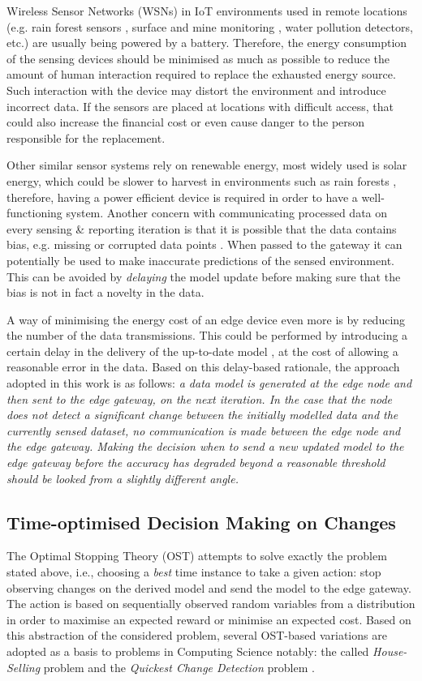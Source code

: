 \documentclass{mpaper}
\begin{document}
Wireless Sensor Networks (WSNs) in IoT environments used in remote locations (e.g. rain forest sensors  \cite{rainforests2009}, surface and mine monitoring \cite{Akkas2018}, water pollution detectors\cite{waterwsn2017}, etc.) are usually being powered by a battery. 
Therefore, the energy consumption of the sensing devices should be minimised as much as possible to reduce the amount of human interaction required to replace the exhausted energy source. 
Such interaction with the device may distort the environment and introduce incorrect data. 
If the sensors are placed at locations with difficult access, that could also increase the financial cost or even cause danger to the person responsible for the replacement.

Other similar sensor systems rely on renewable energy, most widely used is solar energy, which could be slower to harvest in environments such as rain forests \cite{rainforests2009}, 
therefore, having a power efficient device is required in order to have a well-functioning system. Another concern with communicating processed data on every sensing \& reporting iteration is that it is possible that the data contains bias, e.g. missing or corrupted data points \cite{anagnostop2016}. When passed to the gateway it can potentially be used to make inaccurate predictions of the sensed environment. This can be avoided by \textit{delaying} the model update before making sure that the bias is not in fact a novelty in the data.

A way of minimising the energy cost of an edge device even more is by reducing the number of the data transmissions. This could be performed by introducing a certain delay in the delivery of the up-to-date model \citep{anagnostop2014, anagnostop2016, anagnostopkolomvatos2016}, at the cost of allowing a reasonable error in the data. Based on this delay-based rationale, the approach adopted in this work is as follows: \textit{a data model is generated at the edge node and then sent to the edge gateway, on the next iteration. In the case that the node does not detect a significant change between the initially modelled data and the currently sensed dataset, 
no communication is made between the edge node and the edge gateway. 
Making the decision when to send a new updated model to the edge gateway before the accuracy has degraded beyond a reasonable threshold should be looked from a slightly different angle.} 

\subsection{Time-optimised Decision Making on Changes}
The Optimal Stopping Theory (OST) attempts to solve exactly the problem stated above, i.e., choosing a \textit{best} time instance to take a given action: 
stop observing changes on the derived model and send the model to the edge gateway. 
The action is based on sequentially observed random variables from a distribution in order to maximise an expected reward or minimise an expected cost. Based on this abstraction of the considered problem, several OST-based variations are adopted as a basis to problems in Computing Science notably: the called \emph{House-Selling} problem and the \emph{Quickest Change Detection} problem \cite{UCLAbook}.  
\end{document}
